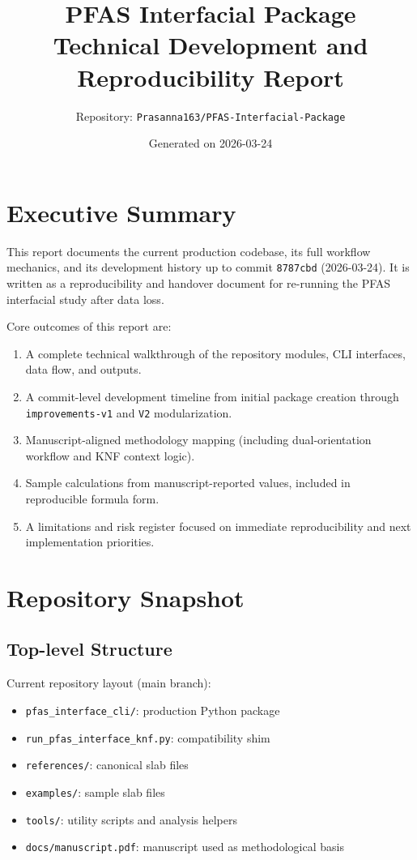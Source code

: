 ﻿\documentclass[11pt]{article}
\title{PFAS Interfacial Package\\Technical Development and Reproducibility Report}
\author{Repository: \texttt{Prasanna163/PFAS-Interfacial-Package}}
\date{Generated on 2026-03-24}
\begin{document}
\maketitle
\tableofcontents
\newpage

\section{Executive Summary}
This report documents the current production codebase, its full workflow mechanics, and its development history up to commit \texttt{8787cbd} (2026-03-24). It is written as a reproducibility and handover document for re-running the PFAS interfacial study after data loss.

Core outcomes of this report are:
\begin{enumerate}[leftmargin=1.5em]
\item A complete technical walkthrough of the repository modules, CLI interfaces, data flow, and outputs.
\item A commit-level development timeline from initial package creation through \texttt{improvements-v1} and \texttt{V2} modularization.
\item Manuscript-aligned methodology mapping (including dual-orientation workflow and KNF context logic).
\item Sample calculations from manuscript-reported values, included in reproducible formula form.
\item A limitations and risk register focused on immediate reproducibility and next implementation priorities.
\end{enumerate}

\section{Repository Snapshot}
\subsection{Top-level Structure}
Current repository layout (main branch):
\begin{itemize}[leftmargin=1.5em]
\item \texttt{pfas\_interface\_cli/}: production Python package
\item \texttt{run\_pfas\_interface\_knf.py}: compatibility shim
\item \texttt{references/}: canonical slab files
\item \texttt{examples/}: sample slab files
\item \texttt{tools/}: utility scripts and analysis helpers
\item \texttt{docs/manuscript.pdf}: manuscript used as methodological basis
\end{itemize}
\end{document}
